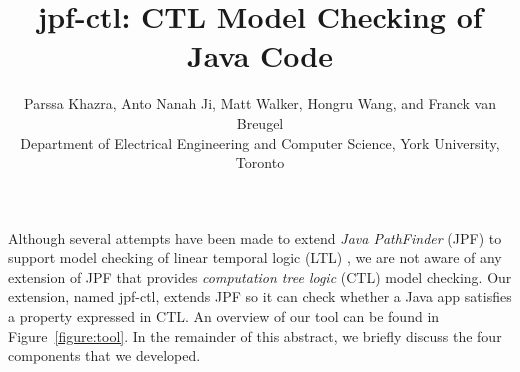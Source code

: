 \documentclass[twocolumn]{article}
\begin{document}

\title{\vspace{-2cm}jpf-ctl: CTL Model Checking of Java Code}
\author{Parssa Khazra, Anto Nanah Ji, Matt Walker, Hongru Wang, and Franck van Breugel\\
Department of Electrical Engineering and Computer Science, York University, Toronto}
\date{\vspace{-0.5cm}}
\maketitle

Although several attempts have been made to extend \emph{Java PathFinder} (JPF) \cite{VHBPL03} to support model checking of linear temporal logic (LTL) \cite{P77}, we are not aware of any extension of JPF that provides \emph{computation tree logic} (CTL) \cite{CE81} model checking.  Our extension, named jpf-ctl, extends JPF so it can check whether a Java app satisfies a property expressed in CTL.  An overview of our tool can be found in Figure~\ref{figure:tool}.  In the remainder of this abstract, we briefly discuss the four components that we developed.
\end{document}
